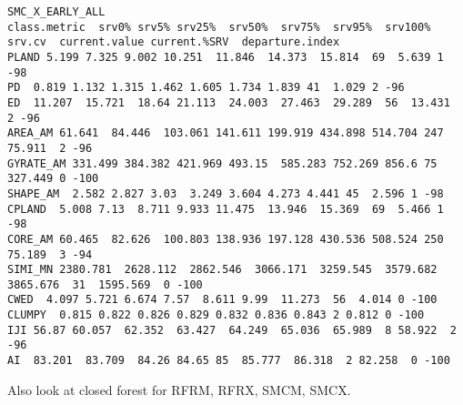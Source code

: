 \begin{verbatim}
SMC_X_EARLY_ALL                     
class.metric  srv0% srv5% srv25%  srv50%  srv75%  srv95%  srv100% srv.cv  current.value current.%SRV  departure.index
PLAND 5.199 7.325 9.002 10.251  11.846  14.373  15.814  69  5.639 1 -98
PD  0.819 1.132 1.315 1.462 1.605 1.734 1.839 41  1.029 2 -96
ED  11.207  15.721  18.64 21.113  24.003  27.463  29.289  56  13.431  2 -96
AREA_AM 61.641  84.446  103.061 141.611 199.919 434.898 514.704 247 75.911  2 -96
GYRATE_AM 331.499 384.382 421.969 493.15  585.283 752.269 856.6 75  327.449 0 -100
SHAPE_AM  2.582 2.827 3.03  3.249 3.604 4.273 4.441 45  2.596 1 -98
CPLAND  5.008 7.13  8.711 9.933 11.475  13.946  15.369  69  5.466 1 -98
CORE_AM 60.465  82.626  100.803 138.936 197.128 430.536 508.524 250 75.189  3 -94
SIMI_MN 2380.781  2628.112  2862.546  3066.171  3259.545  3579.682  3865.676  31  1595.569  0 -100
CWED  4.097 5.721 6.674 7.57  8.611 9.99  11.273  56  4.014 0 -100
CLUMPY  0.815 0.822 0.826 0.829 0.832 0.836 0.843 2 0.812 0 -100
IJI 56.87 60.057  62.352  63.427  64.249  65.036  65.989  8 58.922  2 -96
AI  83.201  83.709  84.26 84.65 85  85.777  86.318  2 82.258  0 -100

\end{verbatim}

Also look at closed forest for RFRM, RFRX, SMCM, SMCX.

